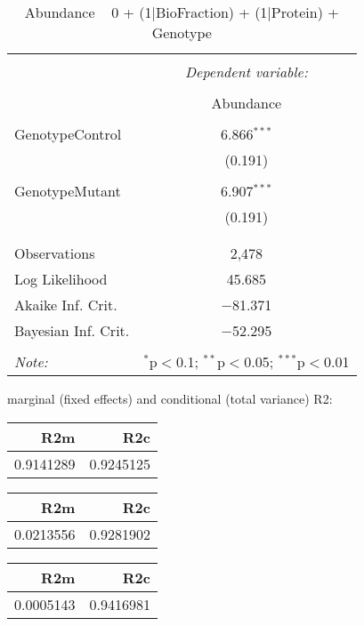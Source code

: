 \documentclass[11pt]{report}
\begin{document}
\begin{table}[!htbp] \centering 
  \caption{Abundance ~ 0 + (1|BioFraction) + (1|Protein) + Genotype} 
  \label{} 
\begin{tabular}{@{\extracolsep{5pt}}lc} 
\\[-1.8ex]\hline 
\hline \\[-1.8ex] 
 & \multicolumn{1}{c}{\textit{Dependent variable:}} \\ 
\cline{2-2} 
\\[-1.8ex] & Abundance \\ 
\hline \\[-1.8ex] 
 GenotypeControl & 6.866$^{***}$ \\ 
  & (0.191) \\ 
  & \\ 
 GenotypeMutant & 6.907$^{***}$ \\ 
  & (0.191) \\ 
  & \\ 
\hline \\[-1.8ex] 
Observations & 2,478 \\ 
Log Likelihood & 45.685 \\ 
Akaike Inf. Crit. & $-$81.371 \\ 
Bayesian Inf. Crit. & $-$52.295 \\ 
\hline 
\hline \\[-1.8ex] 
\textit{Note:}  & \multicolumn{1}{r}{$^{*}$p$<$0.1; $^{**}$p$<$0.05; $^{***}$p$<$0.01} \\ 
\end{tabular} 
\end{table} 
marginal (fixed effects) and conditional (total variance) R2:

\begin{tabular}{r|r}
\hline
R2m & R2c\\
\hline
0.9141289 & 0.9245125\\
\hline
\end{tabular}

\begin{tabular}{r|r}
\hline
R2m & R2c\\
\hline
0.0213556 & 0.9281902\\
\hline
\end{tabular}

\begin{tabular}{r|r}
\hline
R2m & R2c\\
\hline
0.0005143 & 0.9416981\\
\hline
\end{tabular}
\end{document}
